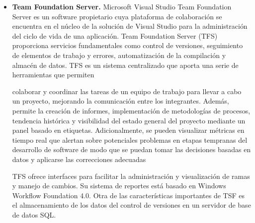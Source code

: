 \documentclass[a4paper,12pt]{article}
\begin{document}
{\begin{itemize}
\begin{itemize}
		\item \textbf{Manejo de datos consistente.} Subversion
		identifica las diferencias de un archivo usando un
		algoritmo de diferenciación binario, que funciona
		exactamente igual en archivos de texto (legibles) y
		archivos binarios (ilegibles por los humanos).
		Ambos tipos de archivos se almacenan
		comprimidos en el repositorio y las diferencias se
		transmiten en ambas direcciones a través de la
		red.
	\end{itemize}

	\item \textbf{Team Foundation Server.}  Microsoft Visual Studio
	Team Foundation Server  es un software
	propietario cuya plataforma de colaboración se
	encuentra en el núcleo de la solución de Visual
	Studio para la administración del ciclo de vida de
	una aplicación. Team Foundation Server (TFS)
	proporciona servicios fundamentales como control
	de versiones, seguimiento de elementos de trabajo
	y errores, automatización de la compilación y
	almacén de datos. TFS es un sistema centralizado
	que aporta una serie de herramientas que permiten
	
	colaborar y coordinar las tareas de un equipo de
	trabajo para llevar a cabo un proyecto, mejorando la
	comunicación entre los integrantes. Además,
	permite la creación de informes, implementación de
	metodologías de procesos, tendencia histórica y
	visibilidad del estado general del proyecto mediante
	un panel basado en etiquetas. Adicionalmente, se
	pueden visualizar métricas en tiempo real que
	alertan sobre potenciales problemas en etapas
	tempranas del desarrollo de software de modo que
	se puedan tomar las decisiones basadas en datos y
	aplicarse las correcciones adecuadas 
	
	TFS ofrece interfaces para facilitar la administración
	y visualización de ramas y manejo de cambios. Su
	sistema de reportes está basado en Windows
	Workflow Foundation 4.0. Otra de las características
	importantes de TSF es el almacenamiento de los
	datos del control de versiones en un servidor de
	base de datos SQL.
\end{itemize}


}
\end{document}
